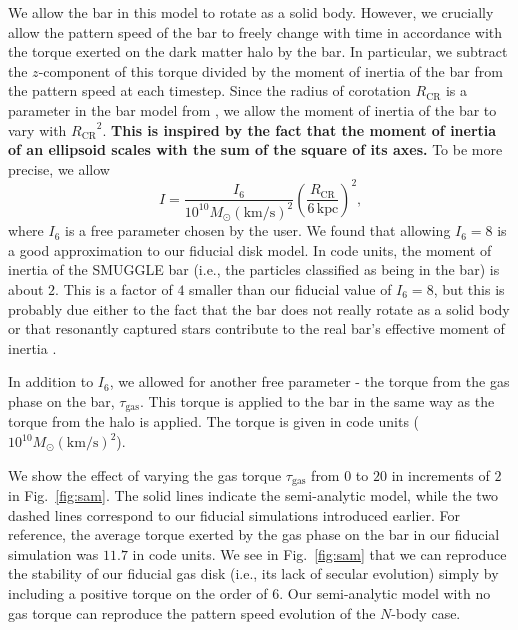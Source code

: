 \documentclass[twocolumn,linenumbers,trackchanges]{aastex631}
\newcommand{\RCR}{\ensuremath{R_{\textrm{CR}}}}
\newcommand{\kms}{\ensuremath{\textrm{km}/\textrm{s}}}
\newcommand{\SMUGGLE}{SMUGGLE}
\newcommand{\Msun}{\ensuremath{M_{\odot}}}
\begin{document}
We allow the bar in this model to rotate as a solid body. However, we crucially
allow the pattern speed of the bar to freely change with time in accordance with
the torque exerted on the dark matter halo by the bar. In particular, we
subtract the $z$-component of this torque divided by the moment of inertia of
the bar from the pattern speed at each timestep. Since the radius of corotation
\RCR{} is a parameter in the bar model from \citet{2022MNRAS.513..768C}, we
allow the moment of inertia of the bar to vary with ${\RCR}^2$. {\bf This is
inspired by the fact that the moment of inertia of an ellipsoid scales with the
sum of the square of its axes.} To be more precise, we allow
\begin{equation}
I = \frac{I_6}{10^{10} \Msun (\kms)^2} \left( \frac{\RCR}{6\,\textrm{kpc}} \right)^2\textrm{,}
\end{equation}
where $I_6$ is a free parameter chosen by the user. We found that allowing
$I_6=8$ is a good approximation to our fiducial disk model. In code units, the
moment of inertia of the \SMUGGLE{} bar (i.e., the particles classified as being in
the bar) is about $2$. This is a factor of $4$ smaller than our fiducial value
of $I_6=8$, but this is probably due either to the fact that the bar does not
really rotate as a solid body or that resonantly captured stars contribute to
the real bar's effective moment of inertia \citep{1985MNRAS.213..451W}.

In addition to $I_6$, we allowed for another free parameter - the torque from
the gas phase on the bar, $\tau_{\textrm{gas}}$. This torque is applied to the
bar in the same way as the torque from the halo is applied. The torque is given
in code units ($10^{10}\Msun \left(\kms\right)^2$).

We show the effect of varying the gas torque $\tau_{\textrm{gas}}$ from $0$ to
$20$ in increments of $2$ in Fig.~\ref{fig:sam}. The solid lines indicate the
semi-analytic model, while the two dashed lines correspond to our fiducial
simulations introduced earlier. For reference, the average torque exerted by the
gas phase on the bar in our fiducial simulation was $11.7$ in code units. We see
in Fig.~\ref{fig:sam} that we can reproduce the stability of our fiducial gas
disk (i.e., its lack of secular evolution) simply by including a positive torque
on the order of $6$. Our semi-analytic model with no gas torque can reproduce
the pattern speed evolution of the $N$-body case.
\end{document}
